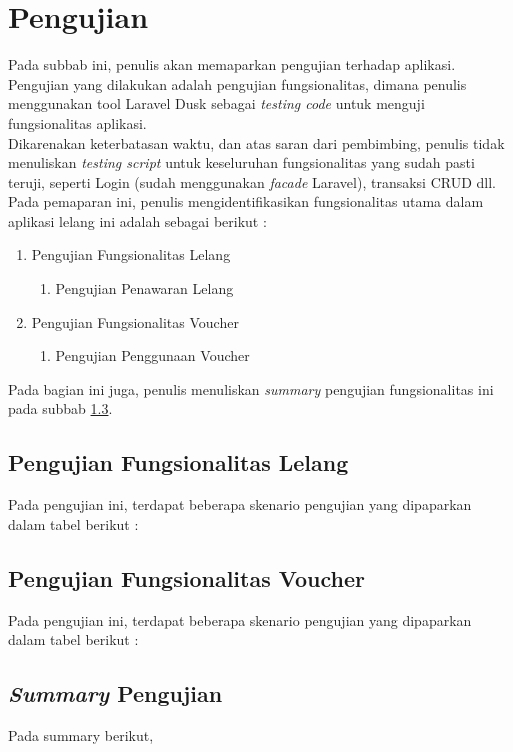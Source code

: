\section{Pengujian}

	Pada subbab ini, penulis akan memaparkan pengujian terhadap aplikasi. Pengujian yang dilakukan adalah pengujian fungsionalitas, dimana penulis menggunakan tool Laravel Dusk sebagai \textit{testing code} untuk menguji fungsionalitas aplikasi.\\
	\tabularnewline Dikarenakan keterbatasan waktu, dan atas saran dari pembimbing, penulis tidak menuliskan \textit{testing script}	untuk keseluruhan fungsionalitas yang sudah pasti teruji, seperti Login (sudah menggunakan \textit{facade} Laravel), transaksi CRUD dll.\\
	Pada pemaparan ini, penulis mengidentifikasikan fungsionalitas utama dalam aplikasi lelang ini adalah sebagai berikut :
	\begin{enumerate}
		\item Pengujian Fungsionalitas Lelang
			  \begin{enumerate}
			  	\item Pengujian Penawaran Lelang
			  \end{enumerate}
	   \item Pengujian Fungsionalitas Voucher
			  \begin{enumerate}
			  	\item Pengujian Penggunaan Voucher
			  \end{enumerate}
	\end{enumerate}
	
	Pada bagian ini juga, penulis menuliskan \textit{summary} pengujian fungsionalitas ini pada subbab \ref{summary-pengujian}.
	
	\subsection{Pengujian Fungsionalitas Lelang}
		Pada pengujian ini, terdapat beberapa skenario pengujian yang dipaparkan dalam tabel berikut :
		
	
	\subsection{Pengujian Fungsionalitas Voucher}
		Pada pengujian ini, terdapat beberapa skenario pengujian yang dipaparkan dalam tabel berikut :
	
	
	\subsection{\textit{Summary} Pengujian}
		\label{summary-pengujian}
		
		Pada summary berikut,
		